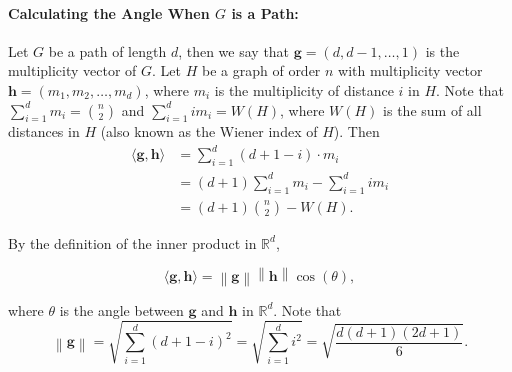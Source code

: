 \documentclass[12]{article}
\newcommand{\R}{\mathbb{R}}
\newcommand{\norm}[1]{\left\lVert #1 \right\rVert}
\theoremstyle{definition}
\begin{document}
	
	\paragraph{Calculating the Angle When $G$ is a Path:} Let $G$ be a path of length $d$, then we say that $\mathbf{g} = (d, d-1, \ldots, 1)$ is the multiplicity vector of $G$.  Let $H$ be a graph of order $n$ with multiplicity vector $\mathbf{h} = (m_1, m_2, \ldots, m_d)$, where $m_i$ is the multiplicity of distance $i$ in $H$.  Note that $\sum_{i=1}^d m_i = {n \choose 2}$ and $\sum_{i=1}^d im_i = W(H)$, where $W(H)$ is the sum of all distances in $H$ (also known as the Wiener index of $H$).  Then 
	\begin{align*}
		\langle \mathbf{g}, \mathbf{h} \rangle &= \sum_{i=1}^d(d+1-i)\cdot m_i	\\
		&= (d+1)\sum_{i=1}^d m_i - \sum_{i=1}^d im_i	\\
		&= (d+1){n \choose 2} - W(H).
	\end{align*}
	
	By the definition of the inner product in $\R^d$,
	
	$$ \langle \mathbf{g}, \mathbf{h} \rangle = \norm{\mathbf{g}} \norm{\mathbf{h}} \cos(\theta),$$
	
	where $\theta$ is the angle between $\mathbf{g}$ and $\mathbf{h}$ in $\R^d$.  Note that 
	$$\norm{\mathbf{g}} = \sqrt{\sum_{i=1}^d (d+1-i)^2} = \sqrt{\sum_{i=1}^d i^2} = \sqrt{\frac{d(d+1)(2d+1)}{6}}.$$
	
\end{document}

